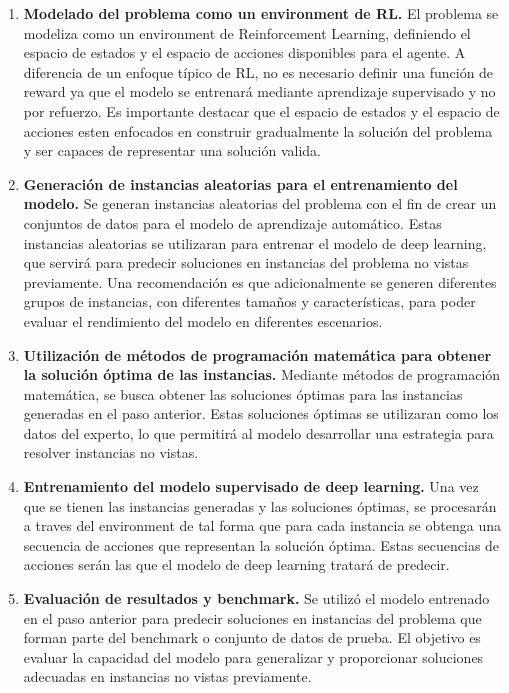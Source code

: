\begin{enumerate}
    \item \textbf{Modelado del problema como un environment de RL.} El problema 
    se modeliza como un environment de Reinforcement Learning, definiendo el espacio de estados 
    y el espacio de acciones disponibles para el agente. A diferencia de un enfoque típico de RL, 
    no es necesario definir una función de reward ya que el modelo se entrenará mediante aprendizaje 
    supervisado y no por refuerzo. Es importante destacar que el espacio de estados y el espacio de
    acciones esten enfocados en construir gradualmente la solución del problema y ser capaces
    de representar una solución valida.
    \item \textbf{Generación de instancias aleatorias para el entrenamiento del modelo.} 
    Se generan instancias aleatorias del problema con el fin de crear un conjuntos de datos 
    para el modelo de aprendizaje automático. Estas instancias aleatorias se utilizaran para entrenar el 
    modelo de deep learning, que servirá para predecir soluciones en instancias del problema no vistas 
    previamente. Una recomendación es que adicionalmente se generen diferentes grupos de instancias,
    con diferentes tamaños y características, para poder evaluar el rendimiento del modelo en diferentes
    escenarios.
    \item \textbf{Utilización de métodos de programación matemática para obtener la solución óptima de 
    las instancias.} Mediante métodos de programación matemática, se busca obtener las soluciones óptimas 
    para las instancias generadas en el paso anterior. Estas soluciones óptimas se utilizaran como los 
    datos del experto, lo que permitirá al modelo desarrollar una estrategia para resolver instancias no vistas.
    \item \textbf{Entrenamiento del modelo supervisado de deep learning.} Una vez que se tienen las instancias
    generadas y las soluciones óptimas, se procesarán a traves del environment de tal forma que para cada
    instancia se obtenga una secuencia de acciones que representan la solución óptima. Estas secuencias de
    acciones serán las que el modelo de deep learning tratará de predecir.
    \item \textbf{Evaluación de resultados y benchmark.} Se utilizó el modelo entrenado 
    en el paso anterior para predecir soluciones en instancias del problema que forman parte del benchmark 
    o conjunto de datos de prueba. El objetivo es evaluar la capacidad del modelo para generalizar y 
    proporcionar soluciones adecuadas en instancias no vistas previamente.
\end{enumerate}

